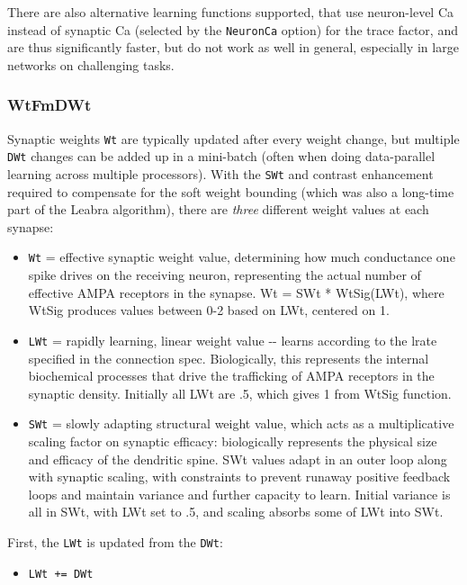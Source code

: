 \documentclass[11pt,twoside]{article}
\newif\myifpdf
\begin{document}
There are also alternative learning functions supported, that use
neuron-level Ca instead of synaptic Ca (selected by the
\texttt{NeuronCa} option) for the trace factor, and are thus
significantly faster, but do not work as well in general, especially in
large networks on challenging tasks.

\hypertarget{wtfmdwt}{%
\subsubsection{WtFmDWt}\label{wtfmdwt}}

Synaptic weights \texttt{Wt} are typically updated after every weight
change, but multiple \texttt{DWt} changes can be added up in a
mini-batch (often when doing data-parallel learning across multiple
processors). With the \texttt{SWt} and contrast enhancement required to
compensate for the soft weight bounding (which was also a long-time part
of the Leabra algorithm), there are \emph{three} different weight values
at each synapse:

\begin{itemize}
\tightlist
\item
  \texttt{Wt} = effective synaptic weight value, determining how much
  conductance one spike drives on the receiving neuron, representing the
  actual number of effective AMPA receptors in the synapse. Wt = SWt *
  WtSig(LWt), where WtSig produces values between 0-2 based on LWt,
  centered on 1.
\item
  \texttt{LWt} = rapidly learning, linear weight value -\/- learns
  according to the lrate specified in the connection spec. Biologically,
  this represents the internal biochemical processes that drive the
  trafficking of AMPA receptors in the synaptic density. Initially all
  LWt are .5, which gives 1 from WtSig function.
\item
  \texttt{SWt} = slowly adapting structural weight value, which acts as
  a multiplicative scaling factor on synaptic efficacy: biologically
  represents the physical size and efficacy of the dendritic spine. SWt
  values adapt in an outer loop along with synaptic scaling, with
  constraints to prevent runaway positive feedback loops and maintain
  variance and further capacity to learn. Initial variance is all in
  SWt, with LWt set to .5, and scaling absorbs some of LWt into SWt.
\end{itemize}

First, the \texttt{LWt} is updated from the \texttt{DWt}:

\begin{itemize}
\tightlist
\item
  \texttt{LWt\ +=\ DWt}
\end{itemize}
\end{document}
